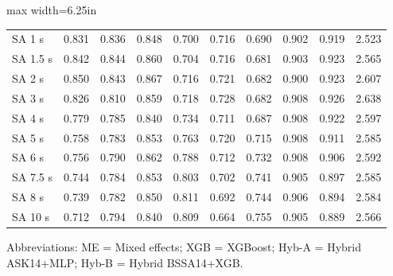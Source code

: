 \begin{table}[htbp]
\begin{adjustbox}{max width=6.25in}
\begin{tabular}{lrrrrrrrrr}
SA 1 s & 0.831 & 0.836 & 0.848 & 0.700 & 0.716 & 0.690 & 0.902 & 0.919 & 2.523 \\
SA 1.5 s & 0.842 & 0.844 & 0.860 & 0.704 & 0.716 & 0.681 & 0.903 & 0.923 & 2.565 \\
SA 2 s & 0.850 & 0.843 & 0.867 & 0.716 & 0.721 & 0.682 & 0.900 & 0.923 & 2.607 \\
SA 3 s & 0.826 & 0.810 & 0.859 & 0.718 & 0.728 & 0.682 & 0.908 & 0.926 & 2.638 \\
SA 4 s & 0.779 & 0.785 & 0.840 & 0.734 & 0.711 & 0.687 & 0.908 & 0.922 & 2.597 \\
SA 5 s & 0.758 & 0.783 & 0.853 & 0.763 & 0.720 & 0.715 & 0.908 & 0.911 & 2.585 \\
SA 6 s & 0.756 & 0.790 & 0.862 & 0.788 & 0.712 & 0.732 & 0.908 & 0.906 & 2.592 \\
SA 7.5 s & 0.744 & 0.784 & 0.853 & 0.803 & 0.702 & 0.741 & 0.905 & 0.897 & 2.585 \\
SA 8 s & 0.739 & 0.782 & 0.850 & 0.811 & 0.692 & 0.744 & 0.906 & 0.894 & 2.584 \\
SA 10 s & 0.712 & 0.794 & 0.840 & 0.809 & 0.664 & 0.755 & 0.905 & 0.889 & 2.566 \\
\bottomrule
\end{tabular}
\end{adjustbox}
\par\smallskip
\parbox{6.25in}{\footnotesize Abbreviations: ME = Mixed effects; XGB = XGBoost; Hyb-A = Hybrid ASK14+MLP; Hyb-B = Hybrid BSSA14+XGB.}
\end{table}
